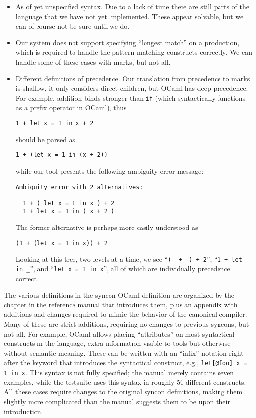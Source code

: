 \documentclass[acmsmall,review,anonymous]{acmart}\settopmatter{printfolios=true,printccs=false,printacmref=false}
\newcommand{\ocaml}{\lstinline[language={[objective]caml}]}
\begin{document}
\begin{itemize}
\item As of yet unspecified syntax. Due to a lack of time there are still parts of the language that we have not yet implemented. These appear solvable, but we can of course not be sure until we do.
\item Our system does not support specifying ``longest match'' on a production, which is required to handle the pattern matching constructs correctly. We can handle some of these cases with marks, but not all.
\item Different definitions of precedence. Our translation from precedence to marks is shallow, it only considers direct children, but OCaml has deep precedence. For example, addition binds stronger than \ocaml{if} (which syntactically functions as a prefix operator in OCaml), thus
  \begin{lstlisting}[language={[objective]caml}]
  1 + let x = 1 in x + 2
  \end{lstlisting}
  should be parsed as
  \begin{lstlisting}[language={[objective]caml}]
  1 + (let x = 1 in (x + 2))
  \end{lstlisting}
  while our tool presents the following ambiguity error message:
  \begin{lstlisting}[language={[objective]caml}]
Ambiguity error with 2 alternatives:

  1 + ( let x = 1 in x ) + 2
  1 + let x = 1 in ( x + 2 )
  \end{lstlisting}
  The former alternative is perhaps more easily understood as
  \begin{lstlisting}[language={[objective]caml}]
  (1 + (let x = 1 in x)) + 2
  \end{lstlisting}
  Looking at this tree, two levels at a time, we see ``\ocaml{(_ + _) + 2}'', ``\ocaml{1 + let _ in _}'', and ``\ocaml{let x = 1 in x}'', all of which are individually precedence correct.
\end{itemize}

The various definitions in the syncon OCaml definition are organized by the chapter in the reference manual that introduces them, plus an appendix with additions and changes required to mimic the behavior of the canonical compiler. Many of these are strict additions, requiring no changes to previous syncons, but not all. For example, OCaml allows placing ``attributes'' on most syntactical constructs in the language, extra information visible to tools but otherwise without semantic meaning. These can be written with an ``infix'' notation right after the keyword that introduces the syntactical construct, e.g., \ocaml{let[@foo] x = 1 in x}. This syntax is not fully specified; the manual merely contains seven examples, while the testsuite uses this syntax in roughly 50 different constructs. All these cases require changes to the original syncon definitions, making them slightly more complicated than the manual suggests them to be upon their introduction.
\end{document}
